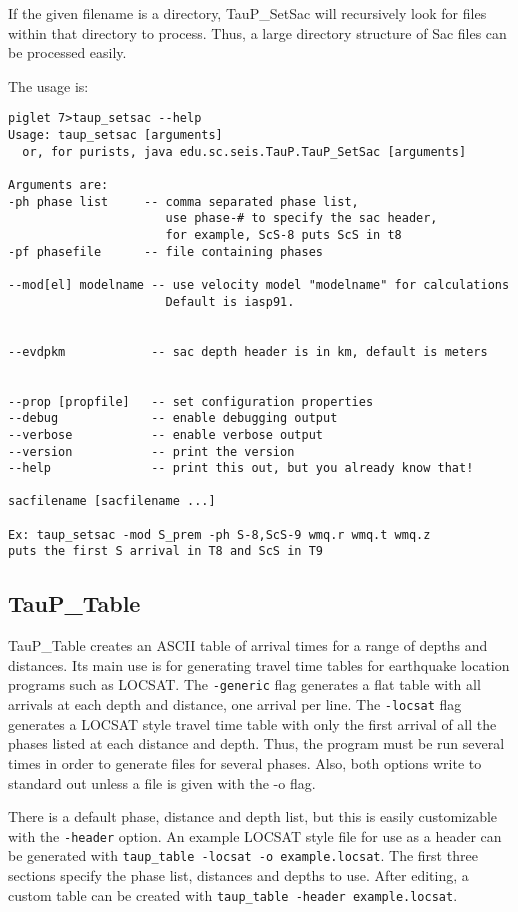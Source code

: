 If the given filename is a directory, TauP\_SetSac will recursively look for files within that directory to process. Thus,
a large directory structure of Sac files can be processed easily.

The usage is:
\begin{verbatim}
piglet 7>taup_setsac --help
Usage: taup_setsac [arguments]
  or, for purists, java edu.sc.seis.TauP.TauP_SetSac [arguments]

Arguments are:
-ph phase list     -- comma separated phase list,
                      use phase-# to specify the sac header,
                      for example, ScS-8 puts ScS in t8
-pf phasefile      -- file containing phases

--mod[el] modelname -- use velocity model "modelname" for calculations
                      Default is iasp91.


--evdpkm            -- sac depth header is in km, default is meters


--prop [propfile]   -- set configuration properties
--debug             -- enable debugging output
--verbose           -- enable verbose output
--version           -- print the version
--help              -- print this out, but you already know that!

sacfilename [sacfilename ...]

Ex: taup_setsac -mod S_prem -ph S-8,ScS-9 wmq.r wmq.t wmq.z
puts the first S arrival in T8 and ScS in T9
\end{verbatim} 

\subsection{TauP\_Table}

TauP\_Table creates an ASCII table of arrival times for a range of depths and
distances. Its main use is for generating travel time tables for earthquake
location programs such as LOCSAT. The \texttt{-generic} flag generates a flat
table with all arrivals at each depth and distance, one arrival per line.
The \texttt{-locsat} flag generates a LOCSAT style travel time table with
only the first arrival of all the phases listed at each distance and depth.
Thus, the program must be run several times in order to generate files for 
several phases. Also, both options write to standard out unless a file is
given with the -o flag.

There is a default phase, distance and depth list, but this is easily 
customizable with the \texttt{-header} option. An example LOCSAT style 
file for use as a header can be generated with 
\texttt{taup\_table -locsat -o example.locsat}. The first 
three sections specify the phase list, distances and depths to use. 
After editing, a custom table can be created with 
\texttt{taup\_table -header example.locsat}.

